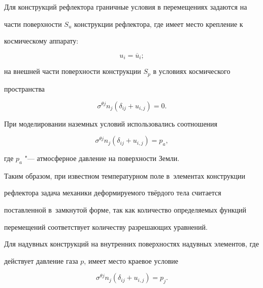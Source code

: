 \newpage


Для конструкций рефлектора граничные условия в перемещениях задаются на 

части поверхности $S_{u}$ конструкции рефлектора, где имеет место крепление к 

космическому аппарату:

\begin{equation*}

 u_i =\overline u_i;

\end{equation*}

на внешней части поверхности конструкции $S_{p}$ в условиях космического 

пространства

\begin{equation*}

 \sigma ^{\theta j}n_{j}(\delta _{ij}+u_{i,j})=0.

\end{equation*}



При моделировании наземных условий использовались соотношения

$$\sigma ^{\theta j}n_{j}(\delta _{ij}+u_{i,j})=p_{a},$$

где $p_{a}$ "--- атмосферное давление на поверхности Земли.



Таким образом, при известном температурном поле в~элементах конструкции 

рефлектора задача механики деформируемого твёрдого тела считается 

поставленной в~замкнутой форме, так как количество определяемых функций 

перемещений соответствует количеству разрешающих уравнений.



Для надувных конструкций на внутренних поверхностях надувных элементов, где 

действует давление газа $p$, имеет место краевое условие

\begin{equation*}

 \sigma ^{\theta j}n_{j}(\delta _{ij}+u_{i,j})=p_{j}.

\end{equation*}






